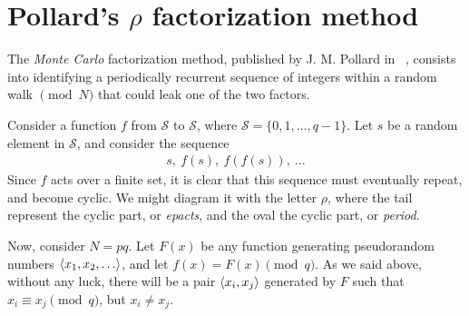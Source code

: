 \chapter{Pollard's $\rho$ factorization method \label{chap:pollardrho}}

The \emph{Monte Carlo} factorization method, published by J. M. Pollard in
~\cite{pollardMC}, consists into identifying a periodically recurrent  sequence
of integers within a random walk $\pmod{N}$ that could leak one of the two
factors.

Consider a function $f$ from $\mathcal{S}$ to $\mathcal{S}$, where
$\mathcal{S} = \{0, 1, \ldots, q-1\}$. Let $s$ be a random element in
$\mathcal{S}$, and consider the sequence
\begin{align*}
  s,\ f(s),\ f(f(s)),\ \ldots
\end{align*}
Since $f$ acts over a finite set, it is clear that this sequence must
eventually repeat, and become cyclic.
We might diagram it with the letter $\rho$, where the tail represent the
cyclic part, or \emph{epacts}, and the oval the cyclic part, or
\emph{period}.
\begin{center}
\end{center}

Now, consider $N=pq$.
Let $F(x)$ be any function generating pseudorandom numbers $\langle x_1, x_2, \ldots\rangle$,
and let $f(x) = F(x) \pmod{q}$.
As we said above, without any luck, there will be a pair $\langle x_i, x_j\rangle$
generated by $F$ such that $x_i \equiv x_j \pmod{q}$, but $x_i \neq x_j$.

